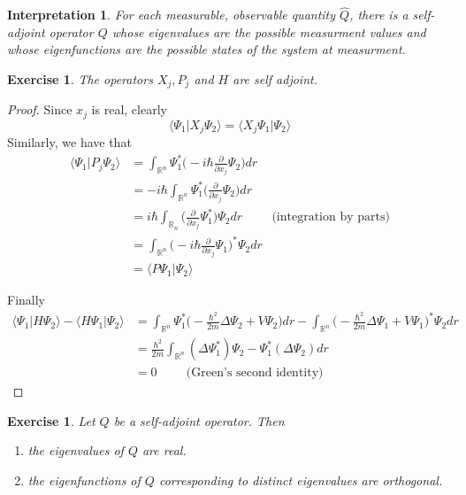 \documentclass[12pt]{amsart}
\newtheorem{intp}[thm]{Interpretation}
\newtheorem{ex}[thm]{Exercise}
\renewcommand{\r}{\rangle}
\renewcommand{\l}{\langle}
\newcommand{\Del}{\Delta}
\newcommand{\R}{\mathbb{R}}
\newcommand{\p}[1]{\frac{\partial}{\partial{#1}}}
\begin{document}
\begin{intp}
For each measurable, observable quantity $\hat{Q}$, there is a self-adjoint operator $Q$ whose eigenvalues are the possible measurment values and whose eigenfunctions are the possible states of the system at measurment.
\end{intp}

\begin{ex}
The operators $X_j, P_j$ and $H$ are self adjoint. 
\end{ex}

\begin{proof}
Since $x_j$ is real, clearly $$\l \Psi_1 \vert X_j \Psi_2 \r = \l X_j\Psi_1 \vert \Psi_2 \r $$ Similarly, we have that 
\begin{align*}
\l \Psi_1 \vert P_j \Psi_2 \r
&=  \int_{\R^n} \Psi_1^* \bigg(-i\hbar\p{x_j} \Psi_2\bigg)dr \\
&= -i \hbar\int_{\R^n} \Psi_1^*  \bigg(\p{x_j} \Psi_2\bigg)dr\\
&= i\hbar \int_{\R_n} \bigg( \p{x_j} \Psi_1^* \bigg) \Psi_2 dr \hspace{1cm } \text{(integration by parts)}\\
&= \int_{\R^n} \bigg( -i \hbar \p{x_j} \Psi_1 \bigg)^* \Psi_2 dr\\
&= \l P \Psi_1 \vert \Psi_2 \r
\end{align*}

Finally 
\begin{align*}
\l \Psi_1 \vert H \Psi_2 \r - \l H \Psi_1 \vert  \Psi_2 \r
&= \int_{\R^n} \Psi_1^* \bigg(-\frac{\hbar^2}{2m}\Del \Psi_2 + V \Psi_2\bigg)dr - \int_{\R^n} \bigg(-\frac{\hbar^2}{2m}\Del \Psi_1 + V\Psi_1\bigg)^*  \Psi_2 dr \\
&= \frac{\hbar^2}{2m}\int_{\R^n} (\Del \Psi_1^* )\Psi_2 - \Psi_1^*(\Del \Psi_2)dr\\
&= 0 \hspace{1cm} \text{(Green's second identity)}
\end{align*}
\end{proof}

\begin{ex}
Let $Q$ be a self-adjoint operator. Then 
\begin{enumerate}
\item the eigenvalues of $Q$ are real.
\item the eigenfunctions of $Q$ corresponding to distinct eigenvalues are orthogonal.
\end{enumerate}
\end{ex}
\end{document}
